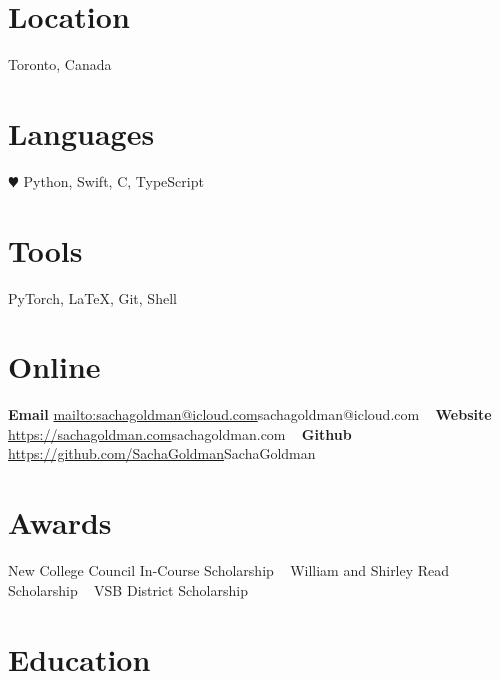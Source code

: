 \documentclass[]{style}
\begin{document}


\begin{aside} %
\section{Location}
Toronto, Canada
\section{Languages}
{\color{red} $\varheartsuit$} Python, Swift, 
C, TypeScript
\section{Tools}
PyTorch, \LaTeX, Git, Shell
\section{Online}
\textbf{Email}
\url{mailto:sachagoldman@icloud.com}{sachagoldman@icloud.com} 
~ \vspace{-2mm}
\textbf{Website} 
\url{https://sachagoldman.com}{sachagoldman.com} 
~ \vspace{-2mm}
\textbf{Github}
\url{https://github.com/SachaGoldman}{SachaGoldman}
\section{Awards}
New College Council 
In-Course Scholarship
~ \vspace{-1mm}
William and Shirley Read 
Scholarship
~ \vspace{-1mm}
VSB District Scholarship
\end{aside}


\section{Education}
\end{document}
